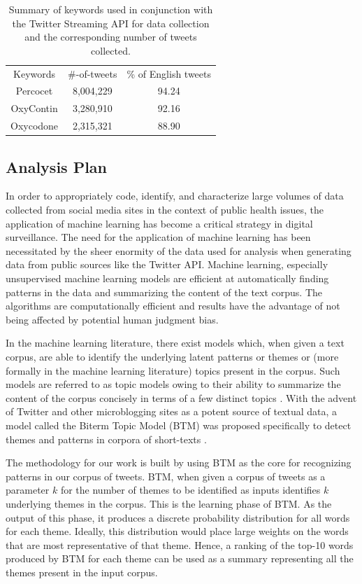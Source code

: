 \begin{table}
\centering
\begin{tabular}{|c|c|c|}
\hline
Keywords &   \#-of-tweets & \% of English tweets \\
Percocet &  8,004,229  & 94.24 \\
OxyContin & 3,280,910  & 92.16 \\
Oxycodone  & 2,315,321 &  88.90 \\
\hline
\end{tabular}
\caption[Summary of the number of tweets collected.]{Summary of keywords used in 
conjunction with the Twitter 
Streaming API for data collection and the corresponding number of tweets collected.}
\label{table:drugs_summary}
\end{table}

\subsection{Analysis Plan}
\label{AB:analysis_plan}

In order to appropriately code, identify, and characterize large 
volumes of data collected from social media sites in the context 
of public health issues, the application of machine learning has 
become a critical strategy in digital surveillance. The need for 
the application of machine learning has been necessitated by the 
sheer enormity of the data used for analysis when generating data 
from public sources like the Twitter API. Machine learning, especially 
unsupervised machine learning models are efficient at automatically 
finding patterns in the data and summarizing the content of the 
text corpus. The algorithms are computationally efficient and results 
have the advantage of not being affected by potential human judgment bias.

In the machine learning literature, there exist models which, 
when given a text corpus, are able to identify the underlying latent 
patterns or themes or (more formally in the machine learning 
literature) topics present in the corpus. Such models are 
referred to as topic models owing to their ability to summarize 
the content of the corpus concisely in terms of a few distinct topics 
\cite{blei2003}. With the advent of Twitter and other microblogging 
sites as a potent source of textual data, a model called the 
Biterm Topic Model (BTM) was proposed specifically to detect 
themes and patterns in corpora of short-texts \cite{yan2013biterm}.

The methodology for our work is built by using 
BTM as the core for recognizing patterns in our corpus of tweets. 
BTM, when given a corpus of tweets as a parameter $k$ 
for the number of themes to be identified as inputs identifies $k$ 
underlying themes in the corpus. This is the learning phase of 
BTM. As the output of this phase, it produces a discrete 
probability distribution for all words for each theme. 
Ideally, this distribution would place large weights on 
the words that are most representative of that theme. 
Hence, a ranking of the top-10 words produced by 
BTM for each theme can be used as a summary 
representing all the themes present in the input corpus.

